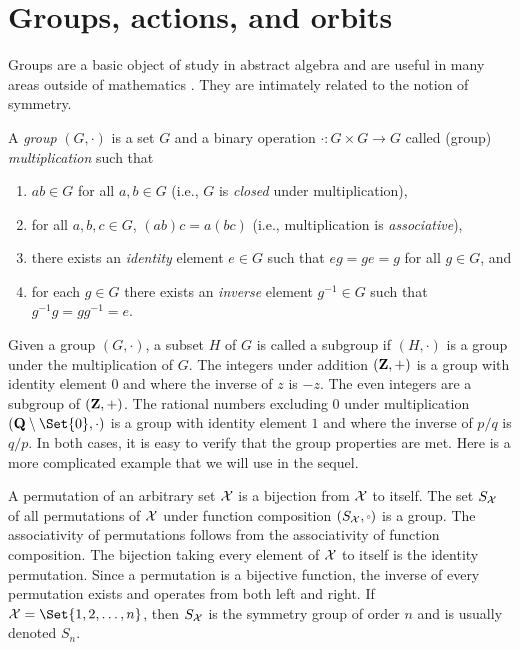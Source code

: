 \chapter{\label{app:def}Groups, actions, and orbits}
\setcounter{example}{0}

Groups are a basic object of study in abstract algebra and
are useful in many areas outside of mathematics \cite{armstrong1997groups, dummit2003abstract, lang2005undergraduate}.  They are intimately
related to the notion of symmetry.

\begin{definition}
A \emph{group} $(G, \cdot)$ is a set $G$ and a binary operation $\cdot: G \times G \to G$
called (group) \emph{multiplication} such that
\begin{enumerate}
\item $ab \in G$ for all $a, b \in G$ (i.e., $G$ is \emph{closed} under multiplication),
\item for all $a, b, c \in G$, $(ab)c = a(bc)$ (i.e., multiplication is \emph{associative}),
\item there exists an \emph{identity} element $e \in G$ such that $eg = ge = g$ for all $g \in G$, and
\item for each $g \in G$ there exists an \emph{inverse} element $g^{-1} \in G$ such that $g^{-1}g = gg^{-1} = e$.
\end{enumerate}
\end{definition}

Given a group $(G, \cdot)$, a subset $H$ of $G$ is called a subgroup if $(H, \cdot)$ is a group
under the multiplication of $G$.  The integers under
addition $(\mathbf{Z}, +)$ is a group with identity element $0$ and where the
inverse of $z$ is $-z$.  The even integers are a subgroup of $(\mathbf{Z}, +)$.
The rational numbers excluding $0$ under multiplication
$(\rationals\setminus \Set{0}, \cdot)$ is a group with identity element $1$ and
where the inverse of $p/q$ is $q/p$. In both cases, it is easy to verify that
the group properties are met.  Here is a more complicated example that we will
use in the sequel. 

\begin{example}
A permutation of an arbitrary set $\mathcal{X}$ is a bijection from $\mathcal{X}$ to itself.  The
set $S_{\mathcal{X}}$ of all permutations of $\mathcal{X}$ under function composition
$(S_\CX, \smallcirc)$ is a group.  The associativity of permutations follows from the
associativity of function composition.  The bijection taking every element of
$\mathcal{X}$ to itself is the identity permutation. Since a permutation is a bijective function, the
inverse of every permutation exists and operates from both left and right.  
If $\CX = \Set{1, 2, \dots, n}$, then $S_{\mathcal{X}}$ is the symmetry group of order $n$
and is usually denoted $S_n$.
\end{example}


